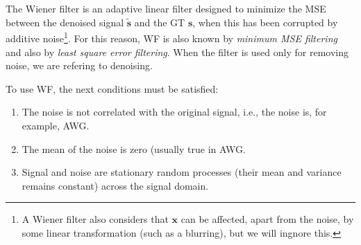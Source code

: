 \chapter{}
\label{cha:WF}

The Wiener filter \cite{wiener1942extrapolation} is an adaptive linear
filter designed to minimize the MSE between the denoised signal
$\tilde{\mathbf{s}}$ and the \gls{GT} $\mathbf{s}$, when this has been
corrupted by additive noise\footnote{A Wiener filter also considers that
  $\mathbf{x}$ can be affected, apart from the noise, by some linear
  transformation (such as a blurring), but we will ingnore this.}. For
this reason, \gls{WF} is also known by \emph{minimum \gls{MSE} filtering} and also
by \emph{least square error filtering}. When the filter is used only
for removing noise, we are refering to denoising.

To use \gls{WF}, the next conditions must be satisfied:
\begin{enumerate}
\item The noise is not correlated with the original signal, i.e., the
  noise is, for example, \gls{AWG}.
\item The mean of the noise is zero (usually true in \gls{AWG}.
\item Signal and noise are stationary random processes (their mean and
  variance remains constant) across the signal domain.
\end{enumerate}

